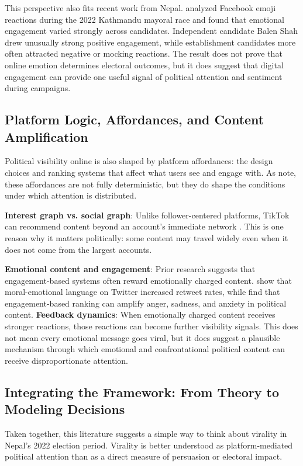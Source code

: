 \documentclass[12pt,a4paper]{report}
\begin{document}
This perspective also fits recent work from Nepal. \parencite{gurungemoji} analyzed Facebook emoji reactions during the 2022 Kathmandu mayoral race and found that emotional engagement varied strongly across candidates. Independent candidate Balen Shah drew unusually strong positive engagement, while establishment candidates more often attracted negative or mocking reactions. The result does not prove that online emotion determines electoral outcomes, but it does suggest that digital engagement can provide one useful signal of political attention and sentiment during campaigns.


\subsection{Platform Logic, Affordances, and Content Amplification}
Political visibility online is also shaped by platform affordances: the design choices and ranking systems that affect what users see and engage with. As \parencite{naranjo2025tweets} note, these affordances are not fully deterministic, but they do shape the conditions under which attention is distributed.

\textbf{Interest graph vs. social graph}: Unlike follower-centered platforms, TikTok can recommend content beyond an account's immediate network \parencite{theshelf2025, buffer2025}. This is one reason why it matters politically: some content may travel widely even when it does not come from the largest accounts.

\textbf{Emotional content and engagement}: Prior research suggests that engagement-based systems often reward emotionally charged content. \parencite{brady2017emotion} show that moral-emotional language on Twitter increased retweet rates, while \parencite{milli2025engagement} find that engagement-based ranking can amplify anger, sadness, and anxiety in political content.
\newpage
\textbf{Feedback dynamics}: When emotionally charged content receives stronger reactions, those reactions can become further visibility signals. This does not mean every emotional message goes viral, but it does suggest a plausible mechanism through which emotional and confrontational political content can receive disproportionate attention.


\subsection{Integrating the Framework: From Theory to Modeling Decisions}
Taken together, this literature suggests a simple way to think about virality in Nepal's 2022 election period. Virality is better understood as platform-mediated political attention than as a direct measure of persuasion or electoral impact.
\end{document}
